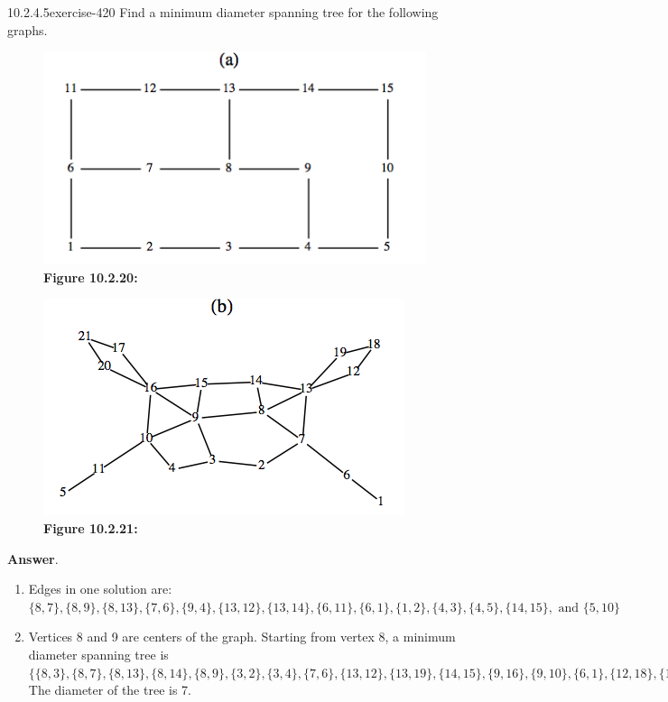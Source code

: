 \documentclass[twoside,10pt,]{book}
\numberwithin{equation}{section}
\begin{document}
\begin{divisionsolution}{10.2.4.5}{}{exercise-420}%
\hypertarget{p-3603}{}%
Find a minimum diameter spanning tree for the following graphs.%
\begin{figure}
\centering
\includegraphics[width=0.8\linewidth]{images/fig-exercise-10-2-5a.png}
\caption*{\textbf{Figure 10.2.20:} }
\end{figure}
\begin{figure}
\centering
\includegraphics[width=0.8\linewidth]{images/fig-exercise-10-2-5b.png}
\caption*{\textbf{Figure 10.2.21:} }
\end{figure}
\par\smallskip%
\noindent\textbf{Answer}.\quad%
\hypertarget{p-3604}{}%
\leavevmode%
\begin{enumerate}[label=(\alph*)]
\item\hypertarget{li-1663}{}\hypertarget{p-3605}{}%
Edges in one solution are: \(\{8,7\},\{8,9\},\{8,13\},\{7,6\},\{9,4\},\{13,12\},\{13,14\},\{6,11\},\{6,1\},\{1,2\},\{4,3\},\{4,5\},\{14,15\},
\textrm{ and } \{5,10\}\)%
\item\hypertarget{li-1664}{}\hypertarget{p-3606}{}%
Vertices 8 and 9 are centers of the graph. Starting from vertex 8, a minimum diameter spanning tree is \(\{\{8, 3\}, \{8, 7\}, \{8, 13\},
\{8, 14\}, \{8, 9\}, \{3, 2\}, \{3, 4\}, \{7, 6\}, \{13, 12\}, \{13, 19\}, \{14, 15\}, \{9, 16\}, \{9, 10\}, \{6, 1\}, \{12, 18\}, \{16, 20\}, \{16,
17\}, \{10, 11\}, \{20, 21\}, \{11, 5\}\}.\)    The diameter of the tree is 7.%
\end{enumerate}
%
\end{divisionsolution}%
\end{document}
